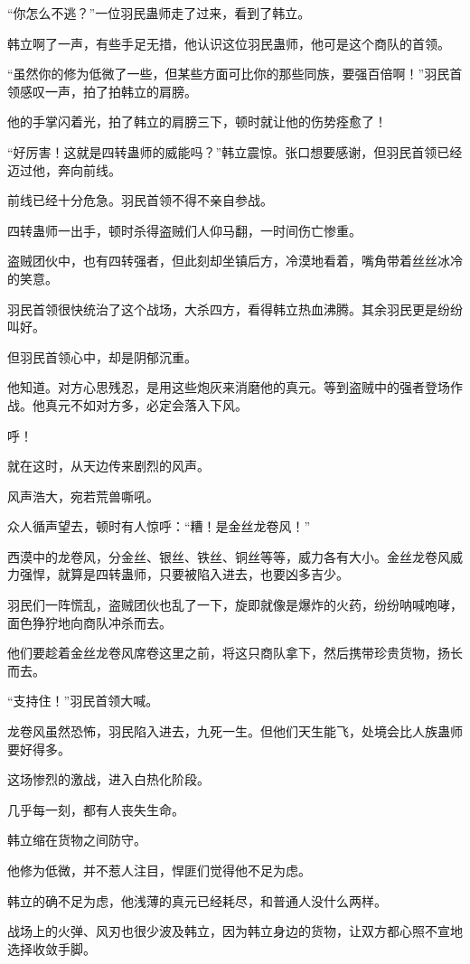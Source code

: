 \begin{this_body}
“你怎么不逃？”一位羽民蛊师走了过来，看到了韩立。

韩立啊了一声，有些手足无措，他认识这位羽民蛊师，他可是这个商队的首领。

“虽然你的修为低微了一些，但某些方面可比你的那些同族，要强百倍啊！”羽民首领感叹一声，拍了拍韩立的肩膀。

他的手掌闪着光，拍了韩立的肩膀三下，顿时就让他的伤势痊愈了！

“好厉害！这就是四转蛊师的威能吗？”韩立震惊。张口想要感谢，但羽民首领已经迈过他，奔向前线。

前线已经十分危急。羽民首领不得不亲自参战。

四转蛊师一出手，顿时杀得盗贼们人仰马翻，一时间伤亡惨重。

盗贼团伙中，也有四转强者，但此刻却坐镇后方，冷漠地看着，嘴角带着丝丝冰冷的笑意。

羽民首领很快统治了这个战场，大杀四方，看得韩立热血沸腾。其余羽民更是纷纷叫好。

但羽民首领心中，却是阴郁沉重。

他知道。对方心思残忍，是用这些炮灰来消磨他的真元。等到盗贼中的强者登场作战。他真元不如对方多，必定会落入下风。

呼！

就在这时，从天边传来剧烈的风声。

风声浩大，宛若荒兽嘶吼。

众人循声望去，顿时有人惊呼：“糟！是金丝龙卷风！”

西漠中的龙卷风，分金丝、银丝、铁丝、铜丝等等，威力各有大小。金丝龙卷风威力强悍，就算是四转蛊师，只要被陷入进去，也要凶多吉少。

羽民们一阵慌乱，盗贼团伙也乱了一下，旋即就像是爆炸的火药，纷纷呐喊咆哮，面色狰狞地向商队冲杀而去。

他们要趁着金丝龙卷风席卷这里之前，将这只商队拿下，然后携带珍贵货物，扬长而去。

“支持住！”羽民首领大喊。

龙卷风虽然恐怖，羽民陷入进去，九死一生。但他们天生能飞，处境会比人族蛊师要好得多。

这场惨烈的激战，进入白热化阶段。

几乎每一刻，都有人丧失生命。

韩立缩在货物之间防守。

他修为低微，并不惹人注目，悍匪们觉得他不足为虑。

韩立的确不足为虑，他浅薄的真元已经耗尽，和普通人没什么两样。

战场上的火弹、风刃也很少波及韩立，因为韩立身边的货物，让双方都心照不宣地选择收敛手脚。


\end{this_body}
